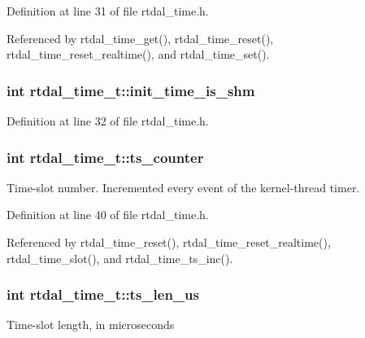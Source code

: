 Definition at line 31 of file rtdal\-\_\-time.\-h.



Referenced by rtdal\-\_\-time\-\_\-get(), rtdal\-\_\-time\-\_\-reset(), rtdal\-\_\-time\-\_\-reset\-\_\-realtime(), and rtdal\-\_\-time\-\_\-set().

\hypertarget{structrtdal__time__t_a13feacdb12d9a613582b8962634105b5}{
\subsubsection[{init\-\_\-time\-\_\-is\-\_\-shm}]{\setlength{\rightskip}{0pt plus 5cm}int rtdal\-\_\-time\-\_\-t\-::init\-\_\-time\-\_\-is\-\_\-shm}}\label{structrtdal__time__t_a13feacdb12d9a613582b8962634105b5}


Definition at line 32 of file rtdal\-\_\-time.\-h.

\hypertarget{structrtdal__time__t_a89a3ee16ee59251793149c861efa7594}{
\subsubsection[{ts\-\_\-counter}]{\setlength{\rightskip}{0pt plus 5cm}int rtdal\-\_\-time\-\_\-t\-::ts\-\_\-counter}}\label{structrtdal__time__t_a89a3ee16ee59251793149c861efa7594}
Time-\/slot number. Incremented every event of the kernel-\/thread timer. 

Definition at line 40 of file rtdal\-\_\-time.\-h.



Referenced by rtdal\-\_\-time\-\_\-reset(), rtdal\-\_\-time\-\_\-reset\-\_\-realtime(), rtdal\-\_\-time\-\_\-slot(), and rtdal\-\_\-time\-\_\-ts\-\_\-inc().

\hypertarget{structrtdal__time__t_a7973db38c7e50480f7a2251a722b8661}{
\subsubsection[{ts\-\_\-len\-\_\-us}]{\setlength{\rightskip}{0pt plus 5cm}int rtdal\-\_\-time\-\_\-t\-::ts\-\_\-len\-\_\-us}}\label{structrtdal__time__t_a7973db38c7e50480f7a2251a722b8661}
Time-\/slot length, in microseconds 

